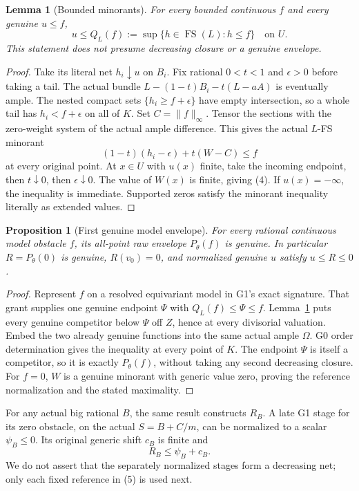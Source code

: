 \documentclass[10pt]{article}
\newtheorem{lemma}[theorem]{Lemma}
\newtheorem{proposition}[theorem]{Proposition}
\newcommand{\FS}{\operatorname{FS}}
\begin{document}
\begin{lemma}[Bounded minorants]\label{density}
For every bounded continuous $f$ and every genuine $u\leq f$,
\[
 u\leq Q_L(f):=\sup\{h\in\FS(L):h\leq f\}\quad\text{on }U.
 \tag{4}
\]
This statement does not presume decreasing closure or a genuine envelope.
\end{lemma}
\begin{proof}
Take its literal net $h_i\downarrow u$ on $B_i$. Fix rational
$0<t<1$ and $\epsilon>0$ before taking a tail. The actual bundle
$L-(1-t)B_i-t(L-aA)$ is eventually ample. The nested compact sets
$\{h_i\geq f+\epsilon\}$ have empty intersection, so a whole tail
has $h_i<f+\epsilon$ on all of $K$. Set $C=\|f\|_\infty$.
Tensor the sections with the zero-weight system of the actual ample
difference. This gives the actual $L$-FS minorant
\[
 (1-t)(h_i-\epsilon)+t(W-C)\leq f
\]
at every original point. At $x\in U$ with $u(x)$ finite, take the
incoming endpoint, then $t\downarrow0$, then $\epsilon\downarrow0$.
The value of $W(x)$ is finite, giving (4). If $u(x)=-\infty$, the
inequality is immediate. Supported zeros satisfy the minorant inequality
literally as extended values.
\end{proof}

\begin{proposition}[First genuine model envelope]\label{model}
For every rational continuous model obstacle $f$, its all-point raw
envelope $P_\theta(f)$ is genuine. In particular $R=P_\theta(0)$
is genuine, $R(v_0)=0$, and normalized genuine $u$ satisfy $u\leq R\leq0$.
\end{proposition}
\begin{proof}
Represent $f$ on a resolved equivariant model in G1's exact signature.
That grant supplies one genuine endpoint $\Psi$ with
$Q_L(f)\leq\Psi\leq f$. Lemma~\ref{density} puts every genuine
competitor below $\Psi$ off $Z$, hence at every divisorial valuation.
Embed the two already genuine functions into the same actual ample
$\Omega$. G0 order determination gives the inequality at every point
of $K$. The endpoint $\Psi$ is itself a competitor, so it is exactly
$P_\theta(f)$, without taking any second decreasing closure.
For $f=0$, $W$ is a genuine minorant with generic value zero, proving
the reference normalization and the stated maximality.
\end{proof}

For any actual big rational $B$, the same result constructs $R_B$.
A late G1 stage for its zero obstacle, on the actual $S=B+C/m$,
can be normalized to a scalar $\psi_B\leq0$. Its original generic
shift $c_B$ is finite and
\[
 R_B\leq\psi_B+c_B.                                      \tag{5}
\]
We do not assert that the separately normalized stages form a
decreasing net; only each fixed reference in (5) is used next.
\end{document}
